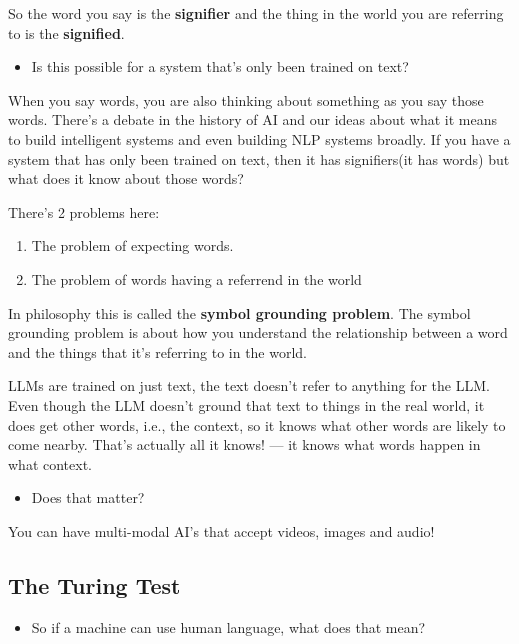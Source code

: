 \documentclass[11pt]{article}
\begin{document}
So the word you say is the \textbf{signifier} and the thing in the world you are referring to is the \textbf{signified}.

\begin{itemize}
  \item Is this possible for a system that's only been trained on text?
\end{itemize}

When you say words, you are also thinking about something as you say those words. There's a debate in the history of AI and our ideas about what it means to build intelligent systems and even building NLP systems broadly. If you have a system that has only been trained on text, then it has signifiers(it has words) but what does it know about those words? 


There's 2 problems here:
\begin{enumerate}
  \item The problem of expecting words.
  \item The problem of words having a referrend in the world
\end{enumerate}

In philosophy this is called the \textbf{symbol grounding problem}. The symbol grounding problem is about how you understand the relationship between a word and the things that it's referring to in the world.


LLMs are trained on just text, the text doesn't refer to anything for the LLM. Even though the LLM doesn't ground that text to things in the real world, it does get other words, i.e., the context, so it knows what other words are likely to come nearby. That's actually all it knows! --- it knows what words happen in what context.

\begin{itemize}
  \item Does that matter?
\end{itemize}

You can have multi-modal AI's that accept videos, images and audio!

\subsection*{The Turing Test}
\begin{itemize}
  \item So if a machine can use human language, what does that mean?
\end{itemize}
\end{document}
